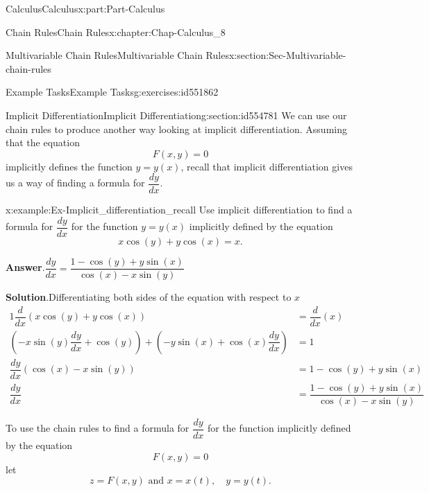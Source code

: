 \documentclass[oneside,10pt,]{book}
\newcommand{\blocktitlefont}{\relax}
\numberwithin{equation}{section}
\newcommand{\amp}{&}
\begin{document}
\begin{partptx}{Calculus}{}{Calculus}{}{}{x:part:Part-Calculus}
\begin{chapterptx}{Chain Rules}{}{Chain Rules}{}{}{x:chapter:Chap-Calculus_8}
\begin{sectionptx}{Multivariable Chain Rules}{}{Multivariable Chain Rules}{}{}{x:section:Sec-Multivariable-chain-rules}
\begin{exercises-subsection-numberless}{Example Tasks}{}{Example Tasks}{}{}{g:exercises:id551862}
\end{exercises-subsection-numberless}
\end{sectionptx}
%
%
\typeout{************************************************}
\typeout{************************************************}
%
\begin{sectionptx}{Implicit Differentiation}{}{Implicit Differentiation}{}{}{g:section:id554781}
We can use our chain rules to produce another way looking at implicit differentiation. Assuming that the equation%
\begin{equation*}
F(x,y) = 0
\end{equation*}
implicitly defines the function \(y=y(x)\), recall that implicit differentiation gives us a way of finding a formula for  \(\dfrac{dy}{dx}\).%
\begin{example}{}{x:example:Ex-Implicit_differentiation_recall}%
Use implicit differentiation to find a formula for \(\dfrac{dy}{dx}\) for the function \(y=y(x)\) implicitly defined by the equation%
\begin{equation*}
x\cos(y) + y\cos(x) =x\text{.}
\end{equation*}
%
\par\smallskip%
\noindent\textbf{\blocktitlefont Answer}.\hypertarget{g:answer:id554823}{}\quad{}\(\dfrac{dy}{dx} = \dfrac{1-\cos(y)+y\sin(x)}{\cos(x)-x\sin(y)}\)%
\par\smallskip%
\noindent\textbf{\blocktitlefont Solution}.\hypertarget{g:solution:id554790}{}\quad{}Differentiating both sides of the equation with respect to \(x\)%
\begin{alignat*}{1}
\dfrac{d}{dx}\left(x\cos(y) + y\cos(x)\right) \amp = \dfrac{d}{dx}(x)\\
\left(-x\sin(y)\dfrac{dy}{dx} + \cos(y)\right) + \left(-y\sin(x)+\cos(x)\dfrac{dy}{dx}\right) \amp =  1\\
\dfrac{dy}{dx}\left(\cos(x)-x\sin(y)\right) \amp = 1-\cos(y) +y\sin(x)\\
\dfrac{dy}{dx} \amp = \dfrac{1-\cos(y)+y\sin(x)}{\cos(x)-x\sin(y)}
\end{alignat*}
%
\end{example}
To use the chain rules to find a formula for \(\dfrac{dy}{dx}\) for the function implicitly defined by the equation%
\begin{equation}
F(x,y)=0\label{x:men:Eqn-Implicit_function}
\end{equation}
let%
\begin{equation*}
z=F(x,y) \text{ and }  x=x(t), \quad y=y(t).

\end{equation*}
\end{sectionptx}
\end{chapterptx}
\end{partptx}
\end{document}
